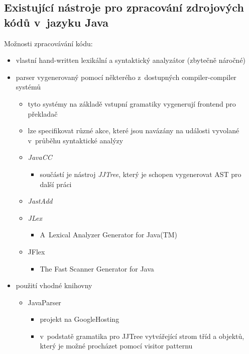 \subsection{Existující nástroje pro zpracování zdrojových kódů v~jazyku Java}


Možnosti zpracovávání kódu:

\begin{itemize}
\item vlastní hand-written lexikální a syntaktický analyzátor (zbytečně náročné)
\item parser vygenerovaný pomocí některého z~dostupných compiler-compiler systémů
  \begin{itemize}
  \item tyto systémy na základě vstupní gramatiky vygenerují frontend pro překladač
  \item lze specifikovat různé akce, které jsou navázány na události vyvolané v~průběhu syntaktické analýzy
  \item \emph{JavaCC} \cite{parsertools:javacc}
    \begin{itemize}
    \item součástí je nástroj \emph{JJTree}, který je schopen vygenerovat AST pro další práci
    \end{itemize}
  \item \emph{JastAdd} \cite {parsertools:jastadd}
  \item \emph{JLex} \cite{parsertools:jlex}
    \begin{itemize}
    \item A~Lexical Analyzer Generator for Java(TM)
    \end{itemize}
  \item JFlex \cite{parsertools:jflex}
    \begin{itemize}
    \item The Fast Scanner Generator for Java
    \end{itemize}
  \end{itemize}
\item použití vhodné knihovny
  \begin{itemize}
  \item JavaParser \cite{parsertools:javaparser}
    \begin{itemize}
    \item projekt na GoogleHosting
    \item v~podstatě gramatika pro JJTree vytvářející strom tříd a objektů, který je možné procházet pomocí visitor patternu

\end{itemize}
\end{itemize}
\end{itemize}
